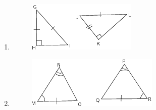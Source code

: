 \begin{enumerate}[noitemsep, label=\textbf{\arabic*}. ]
\begin{enumerate}[noitemsep, label=\textbf{\alph*}. ]
\begin{figure}[H]
\begin{center}
    \end{center}

 \end{figure}   

    \addtocounter{footnote}{-0}
    \label{m39368*uid128}\item 
    \setcounter{subfigure}{0}


	\begin{figure}[H] %
    \begin{center}
    \label{m39368*id320530!!!underscore!!!media}\label{m39368*id320530!!!underscore!!!printimage}\includegraphics{col11306.imgs/m39368_MG10C13_061.png} %
        
      \vspace{2pt}
    \vspace{.1in}
    
    \end{center}

 \end{figure}   

    \addtocounter{footnote}{-0}
    \label{m39368*uid129}\item 
    \setcounter{subfigure}{0}


	\begin{figure}[H] %
    \begin{center}
    \label{m39368*id320548!!!underscore!!!media}\label{m39368*id320548!!!underscore!!!printimage}\includegraphics{col11306.imgs/m39368_MG10C13_062.png} %
        
      \vspace{2pt}
    \vspace{.1in}
    
    \end{center}

 \end{figure}   


\end{enumerate}
\end{enumerate}
